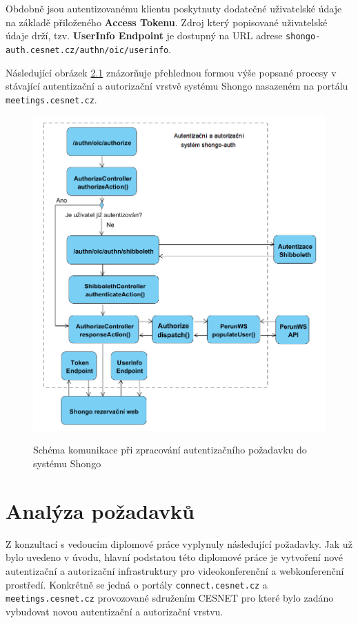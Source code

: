 \documentclass[
  printed, %
  twoside, %
  table,   %
  nolof,     %
  nolot,     %
]{fithesis3}
\begin{document}
Obdobně jsou autentizovanému klientu poskytnuty dodatečné uživatelské údaje na základě přiloženého \textbf{Access Tokenu}. Zdroj který popisované uživatelské údaje drží, tzv. \textbf{UserInfo Endpoint} je dostupný na URL adrese \texttt{shongo-auth.cesnet.cz/authn/oic/userinfo}.  \par 

Následující obrázek \hyperref[fig:shongoAuthnProcess]{2.1} znázorňuje přehlednou formou výše popsané procesy v stávající autentizační a autorizační vrstvě systému Shongo nasazeném na portálu \texttt{meetings.cesnet.cz}. 

\begin{figure}[H]
\caption{Schéma komunikace při zpracování autentizačního požadavku do systému Shongo}
\centering
\includegraphics[width=12.8cm]{pics/shongoAuthSystem} 
\label{fig:shongoAuthnProcess}
\end{figure}
\par 


\section{Analýza požadavků}
Z konzultací s vedoucím diplomové práce vyplynuly následující požadavky. Jak už bylo uvedeno v úvodu, hlavní podstatou této diplomové práce je vytvoření nové autentizační a autorizační infrastruktury pro videokonferenční a webkonferenční prostředí. Konkrétně se jedná o portály \texttt{connect.cesnet.cz} a \texttt{meetings.cesnet.cz} provozované sdružením CESNET pro které bylo zadáno vybudovat novou autentizační a autorizační vrstvu. 
\end{document}

